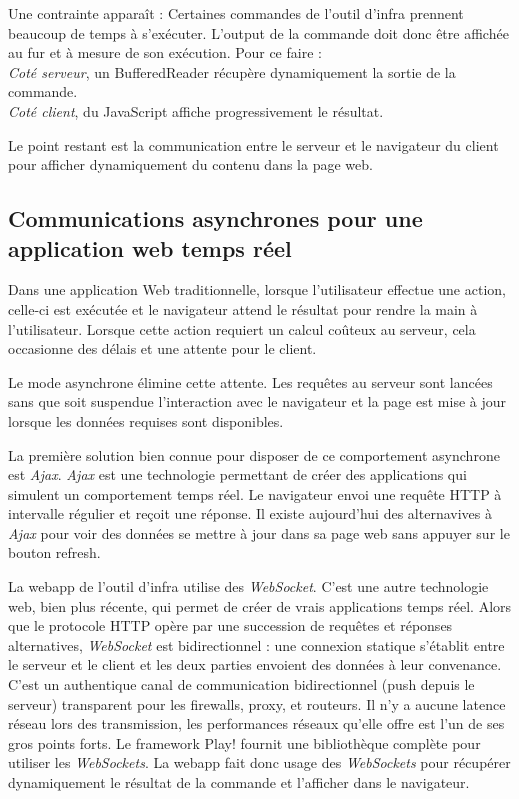 Une contrainte apparaît :
Certaines commandes de l'outil d'infra prennent beaucoup de temps à s'exécuter.
L'output de la commande doit donc être affichée au fur et à mesure de son
exécution. Pour ce faire :\\
\textit{Coté serveur}, un BufferedReader récupère dynamiquement la sortie de la commande.\\
\textit{Coté client}, du JavaScript affiche progressivement le résultat.

Le point restant est la communication entre le serveur et le navigateur du
client pour afficher dynamiquement du contenu dans la page web.

\subsection{Communications asynchrones pour une application web temps réel}

Dans une application Web traditionnelle, lorsque l'utilisateur effectue une
action, celle-ci est exécutée et le navigateur attend le résultat pour rendre
la main à l'utilisateur. Lorsque cette action requiert un calcul coûteux
au serveur, cela occasionne des délais et une attente pour le client.

Le mode asynchrone élimine cette attente. Les requêtes au serveur sont lancées
sans que soit suspendue l'interaction avec le navigateur et la page est mise à
jour lorsque les données requises sont disponibles.

La première solution bien connue pour disposer de ce comportement asynchrone est
\textit{Ajax}.
\textit{Ajax} est une technologie permettant de créer des applications qui simulent un
comportement temps réel. Le navigateur envoi une requête HTTP à intervalle
régulier et reçoit une réponse.
Il existe aujourd'hui des alternavives à \textit{Ajax} pour voir des données se mettre à
jour dans sa page web sans appuyer sur le bouton refresh.

La webapp de l'outil d'infra utilise des \textit{WebSocket}.
C'est une autre technologie web, bien plus récente, qui permet de créer de vrais
applications temps réel.
Alors que le protocole HTTP opère par une succession de requêtes et réponses
alternatives, \textit{WebSocket} est bidirectionnel : une connexion statique s'établit
entre le serveur et le client et les deux parties envoient des données à leur
convenance.
C'est un authentique canal de communication bidirectionnel (push depuis le
serveur) transparent pour les firewalls, proxy, et routeurs.
Il n'y a aucune latence réseau lors des transmission, les performances réseaux
qu'elle offre est l'un de ses gros points forts.
Le framework Play! fournit une bibliothèque complète pour utiliser les
\textit{WebSockets}.
La webapp fait donc usage des \textit{WebSockets} pour récupérer dynamiquement le
résultat de la commande et l'afficher dans le navigateur.

